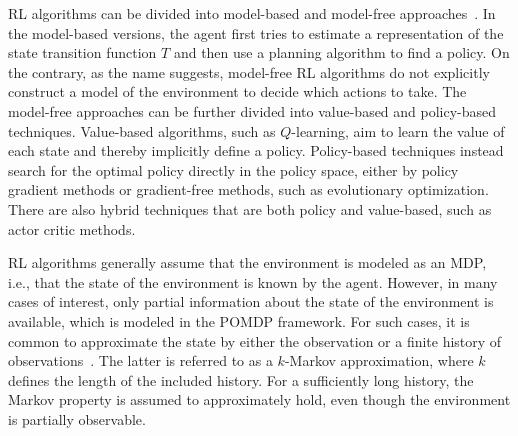 




RL algorithms can be divided into model-based and model-free approaches~\cite[Ch. 5]{Kochenderfer2015}. In the model-based versions, the agent first tries to estimate a representation of the state transition function $T$ and then use a planning algorithm to find a policy. On the contrary, as the name suggests, model-free RL algorithms do not explicitly construct a model of the environment to decide which actions to take. 
The model-free approaches can be further divided into value-based and policy-based techniques. Value-based algorithms, such as $Q$-learning, aim to learn the value of each state and thereby implicitly define a policy. Policy-based techniques instead search for the optimal policy directly in the policy space, either by policy gradient methods or gradient-free methods, such as evolutionary optimization. There are also hybrid techniques that are both policy and value-based, such as actor critic methods.




RL algorithms generally assume that the environment is modeled as an MDP, i.e., that the state of the environment is known by the agent. However, in many cases of interest, only partial information about the state of the environment is available, which is modeled in the POMDP framework. For such cases, it is common to approximate the state by either the observation or a finite history of observations~\cite[Ch. 17]{Sutton2018}. The latter is referred to as a $k$-Markov approximation, where $k$ defines the length of the included history. For a sufficiently long history, the Markov property is assumed to approximately hold, even though the environment is partially observable.

